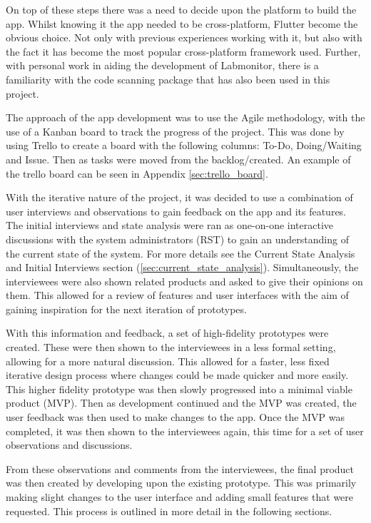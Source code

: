 \documentclass [11pt,a4paper]{article}
\begin{document}
On top of these steps there was a need to decide upon the platform to build the app. Whilst knowing it the app needed to be cross-platform, Flutter become the obvious choice. Not only with previous experiences working with it, but also with the fact it has become the most popular cross-platform framework \cite{JetBrainsFlutter} used. Further, with personal work in aiding the development of Labmonitor\cite{labmonitor}, there is a familiarity with the code scanning package that has also been used in this project\cite{barcodeScannerPlugin}.

The approach of the app development was to use the Agile methodology, with the use of a Kanban board to track the progress of the project. This was done by using Trello to create a board with the following columns: To-Do, Doing/Waiting and Issue. Then as tasks were moved from the backlog/created. An example of the trello board can be seen in Appendix \ref{sec:trello_board}.

With the iterative nature of the project, it was decided to use a combination of user interviews and observations to gain feedback on the app and its features. The initial interviews and state analysis were ran as one-on-one interactive discussions with the system administrators (RST) to gain an understanding of the current state of the system. For more details see the Current State Analysis and Initial Interviews section (\ref{sec:current_state_analysis}). Simultaneously, the interviewees were also shown related products and asked to give their opinions on them. This allowed for a review of features and user interfaces with the aim of gaining inspiration for the next iteration of prototypes. 

With this information and feedback, a set of high-fidelity prototypes were created. These were then shown to the interviewees in a less formal setting, allowing for a more natural discussion. This allowed for a faster, less fixed iterative design process where changes could be made quicker and more easily. This higher fidelity prototype was then slowly progressed into a minimal viable product (MVP). Then as development continued and the MVP was created, the user feedback was then used to make changes to the app. Once the MVP was completed, it was then shown to the interviewees again, this time for a set of user observations and discussions. 

From these observations and comments from the interviewees, the final product was then created by developing upon the existing prototype. This was primarily making slight changes to the user interface and adding small features that were requested. This process is outlined in more detail in the following sections.
\end{document}
